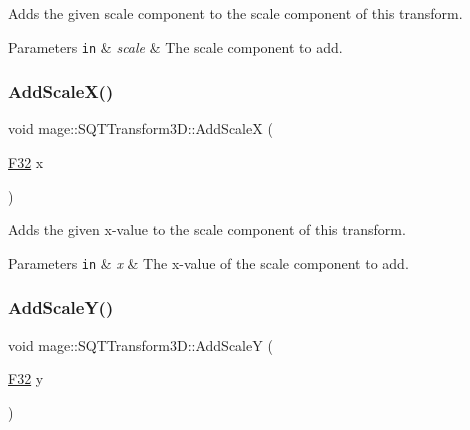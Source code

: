 Adds the given scale component to the scale component of this transform.


\begin{DoxyParams}[1]{Parameters}
\mbox{\tt in}  & {\em scale} & The scale component to add. \\
\hline
\end{DoxyParams}
\mbox{\label{classmage_1_1_s_q_t_transform3_d_a641e3b596cc6e0f82fe75a2c22930557}} 
\subsubsection{\texorpdfstring{Add\+Scale\+X()}{AddScaleX()}}
{\footnotesize\ttfamily void mage\+::\+S\+Q\+T\+Transform3\+D\+::\+Add\+ScaleX (\begin{DoxyParamCaption}\item[{\mbox{\hyperlink{namespacemage_aa97e833b45f06d60a0a9c4fc22ae02c0}{F32}}}]{x }\end{DoxyParamCaption})\hspace{0.3cm}{\ttfamily [noexcept]}}

Adds the given x-\/value to the scale component of this transform.


\begin{DoxyParams}[1]{Parameters}
\mbox{\tt in}  & {\em x} & The x-\/value of the scale component to add. \\
\hline
\end{DoxyParams}
\mbox{\label{classmage_1_1_s_q_t_transform3_d_a2582d5c8223077d9d09af87e80b944e3}} 
\subsubsection{\texorpdfstring{Add\+Scale\+Y()}{AddScaleY()}}
{\footnotesize\ttfamily void mage\+::\+S\+Q\+T\+Transform3\+D\+::\+Add\+ScaleY (\begin{DoxyParamCaption}\item[{\mbox{\hyperlink{namespacemage_aa97e833b45f06d60a0a9c4fc22ae02c0}{F32}}}]{y }\end{DoxyParamCaption})\hspace{0.3cm}{\ttfamily [noexcept]}}

